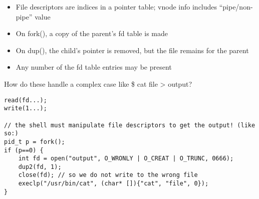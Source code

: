 \documentclass[../../lecture_notes.tex]{subfiles}
\begin{document}
\begin{center}
\end{center}

\begin{itemize}[nosep]
\item File descriptors are indices in a pointer table; vnode info includes “pipe/non-pipe” value
\item On fork(), a copy of the parent’s fd table is made
\item On dup(), the child’s pointer is removed, but the file remains for the parent
\item Any number of the fd table entries may be present
\end{itemize}

How do these handle a complex case like \$ cat file > output?
\begin{lstlisting}
read(fd...);
write(1...);

// the shell must manipulate file descriptors to get the output! (like so:)
pid_t p = fork();
if (p==0) {
	int fd = open("output", O_WRONLY | O_CREAT | O_TRUNC, 0666);
	dup2(fd, 1);
	close(fd); // so we do not write to the wrong file
	execlp("/usr/bin/cat", (char* []){"cat", "file", 0});
}
\end{lstlisting}
\end{document}
